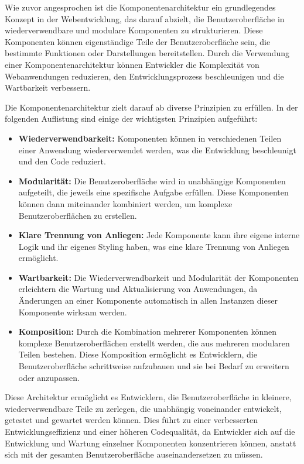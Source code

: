 Wie zuvor angesprochen ist die Komponentenarchitektur ein grundlegendes Konzept in der Webentwicklung, das darauf abzielt, die Benutzeroberfläche in wiederverwendbare und modulare Komponenten zu strukturieren. Diese Komponenten können eigenständige Teile der Benutzeroberfläche sein, die bestimmte Funktionen oder Darstellungen bereitstellen. Durch die Verwendung einer Komponentenarchitektur können Entwickler die Komplexität von Webanwendungen reduzieren, den Entwicklungsprozess beschleunigen und die Wartbarkeit verbessern.

Die Komponentenarchitektur zielt darauf ab diverse Prinzipien zu erfüllen. In der folgenden Auflistung sind einige der wichtigsten Prinzipien aufgeführt:

\begin{itemize}
    \item \textbf{Wiederverwendbarkeit:} Komponenten können in verschiedenen Teilen einer Anwendung wiederverwendet werden, was die Entwicklung beschleunigt und den Code reduziert.
    \item \textbf{Modularität:} Die Benutzeroberfläche wird in unabhängige Komponenten aufgeteilt, die jeweils eine spezifische Aufgabe erfüllen. Diese Komponenten können dann miteinander kombiniert werden, um komplexe Benutzeroberflächen zu erstellen.
    \item \textbf{Klare Trennung von Anliegen:} Jede Komponente kann ihre eigene interne Logik und ihr eigenes Styling haben, was eine klare Trennung von Anliegen ermöglicht.
    \item \textbf{Wartbarkeit:} Die Wiederverwendbarkeit und Modularität der Komponenten erleichtern die Wartung und Aktualisierung von Anwendungen, da Änderungen an einer Komponente automatisch in allen Instanzen dieser Komponente wirksam werden.
    \item \textbf{Komposition:} Durch die Kombination mehrerer Komponenten können komplexe Benutzeroberflächen erstellt werden, die aus mehreren modularen Teilen bestehen. Diese Komposition ermöglicht es Entwicklern, die Benutzeroberfläche schrittweise aufzubauen und sie bei Bedarf zu erweitern oder anzupassen.
\end{itemize}

Diese Architektur ermöglicht es Entwicklern, die Benutzeroberfläche in kleinere, wiederverwendbare Teile zu zerlegen, die unabhängig voneinander entwickelt, getestet und gewartet werden können. Dies führt zu einer verbesserten Entwicklungseffizienz und einer höheren Codequalität, da Entwickler sich auf die Entwicklung und Wartung einzelner Komponenten konzentrieren können, anstatt sich mit der gesamten Benutzeroberfläche auseinandersetzen zu müssen.\cite{component-architecture:1, component-architecture:2}

